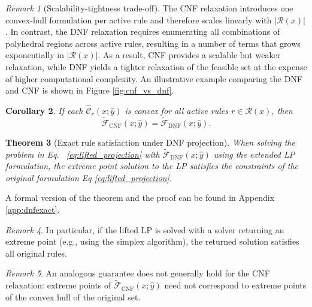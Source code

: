 \documentclass{article}
\theoremstyle{plain}
\newtheorem{theorem}{Theorem}[section]
\newtheorem{corollary}[theorem]{Corollary}
\theoremstyle{definition}
\theoremstyle{remark}
\newtheorem{remark}[theorem]{Remark}
\begin{document}
\begin{remark}[Scalability-tightness trade-off]
The CNF relaxation introduces one convex-hull formulation per active rule
and therefore scales linearly with $|\mathcal{R}(x)|$.
In contrast, the DNF relaxation requires enumerating all combinations of polyhedral regions
across active rules, resulting in a number of terms that grows exponentially in $|\mathcal{R}(x)|$.
As a result, CNF provides a scalable but weaker relaxation,
while DNF yields a tighter relaxation of the feasible set
at the expense of higher computational complexity. An illustrative example comparing the DNF and CNF is shown in Figure \ref{fig:cnf_vs_dnf}.
\end{remark}

\begin{corollary}
If each $\widehat{\mathcal{C}}_r(x;\hat y)$ is convex
for all active rules $r\in\mathcal{R}(x)$, then
\[
\widetilde{\mathcal{F}}_{\mathrm{CNF}}(x;\hat{y} )
=
\widetilde{\mathcal{F}}_{\mathrm{DNF}}(x;\hat{y}).
\]
\end{corollary}

\begin{theorem}[Exact rule satisfaction under DNF projection]\label{thm:dnf_exact}
When solving the problem in Eq. ~\eqref{eq:lifted_projection} with $\widetilde{\mathcal{F}}_{\mathrm{DNF}}(x; \hat y)$ using the extended LP formulation, the extreme point solution to the LP satisfies the constraints of the original formulation Eq \eqref{eq:lifted_projection}.
\end{theorem}
A formal version of the theorem and the proof can be found in Appendix \ref{app:dnfexact}.
\begin{remark}
In particular, if the lifted LP is solved with a solver returning an extreme point (e.g., using the simplex algorithm), the returned solution satisfies all original rules.
\end{remark}

\begin{remark}
An analogous guarantee does not generally hold for the CNF relaxation:
extreme points of $\widetilde{\mathcal{F}}_{\mathrm{CNF}}(x;\hat y)$ need not correspond to extreme points of the convex hull of the original set.
\end{remark}
\end{document}

